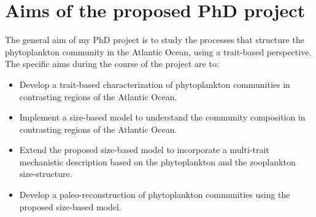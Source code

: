 \section{Aims of the proposed PhD project}
The general aim of my PhD project is to study the processes that structure the phytoplankton community in the Atlantic Ocean, using a trait-based perspective. The specific aims during the course of the project are to:

\begin{itemize}
\item Develop a trait-based characterization of phytoplankton communities in contrasting regions of the Atlantic Ocean. 

\item Implement a size-based model to understand the community composition in contrasting regions of the Atlantic Ocean.
\item Extend the proposed size-based model to incorporate a multi-trait mechanistic description based on the phytoplankton and the zooplankton size-structure.
\item Develop a paleo-reconstruction of phytoplankton communities using the proposed size-based model.
\end{itemize}
